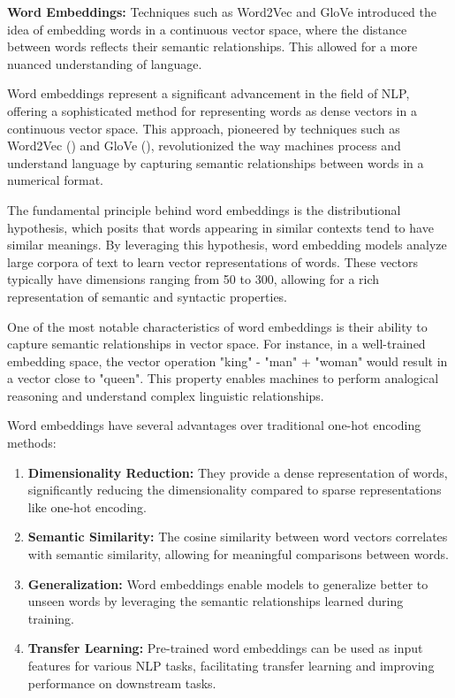 \textbf{Word Embeddings:} Techniques such as Word2Vec and GloVe introduced the idea of embedding words in a continuous vector space, where the distance between words reflects their semantic relationships. This allowed for a more nuanced understanding of language.

Word embeddings represent a significant advancement in the field of NLP, offering a sophisticated method for representing words as dense vectors in a continuous vector space. This approach, pioneered by techniques such as Word2Vec (\cite{mikolov2013efficient}) and GloVe (\cite{pennington2014glove}), revolutionized the way machines process and understand language by capturing semantic relationships between words in a numerical format.

The fundamental principle behind word embeddings is the distributional hypothesis, which posits that words appearing in similar contexts tend to have similar meanings. By leveraging this hypothesis, word embedding models analyze large corpora of text to learn vector representations of words. These vectors typically have dimensions ranging from 50 to 300, allowing for a rich representation of semantic and syntactic properties.

One of the most notable characteristics of word embeddings is their ability to capture semantic relationships in vector space. For instance, in a well-trained embedding space, the vector operation "king" - "man" + "woman" would result in a vector close to "queen". This property enables machines to perform analogical reasoning and understand complex linguistic relationships.

Word embeddings have several advantages over traditional one-hot encoding methods:

\begin{enumerate}
    \item \textbf{Dimensionality Reduction:} They provide a dense representation of words, significantly reducing the dimensionality compared to sparse representations like one-hot encoding.
    \item \textbf{Semantic Similarity:} The cosine similarity between word vectors correlates with semantic similarity, allowing for meaningful comparisons between words.
    \item \textbf{Generalization:} Word embeddings enable models to generalize better to unseen words by leveraging the semantic relationships learned during training.
    \item \textbf{Transfer Learning:} Pre-trained word embeddings can be used as input features for various NLP tasks, facilitating transfer learning and improving performance on downstream tasks.
\end{enumerate}

